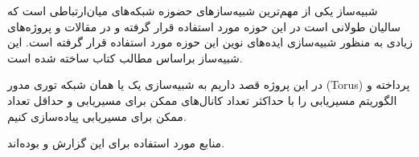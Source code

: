 


شبیه‌ساز  یکی از مهم‌ترین شبیه‌سازهای حضوزه شبکه‌های میان‌ارتباطی است که سالیان طولانی است در این حوزه مورد استفاده قرار گرفته و در مقالات و پروژه‌های زیادی به منظور شبیه‌سازی ایده‌های نوین این حوزه مورد استفاده قرار گرفته است. این شبیه‌ساز براساس مطالب کتاب 
ساخته شده است.

در این پروژه قصد داریم به شبیه‌سازی یک
یا همان شبکه توری مدور (Torus) پرداخته و الگوریتم مسیریابی  را با حداکثر تعداد کانال‌های ممکن برای مسیریابی
 و حداقل تعداد ممکن برای مسیریابی
   پیاده‌سازی کنیم.


منابع مورد استفاده برای این گزارش \cite{dally2004principles} و \cite{jiang2010booksim} بوده‌اند.
